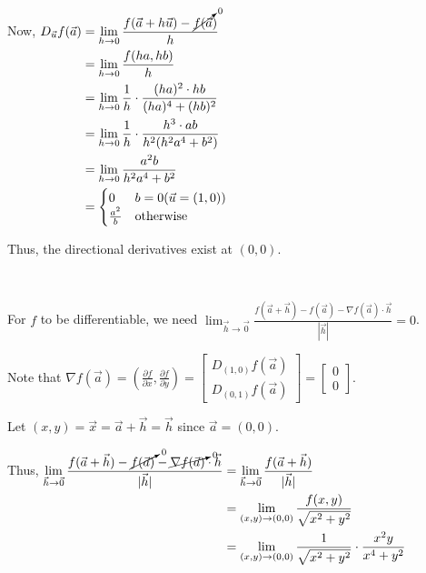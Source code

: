 \documentclass[11pt,fleqn]{book} %
\begin{document}
Now, 
$\begin{aligned}[t]
    D_{\vec{u}} f(\vec{a}) & = \lim_{h\to0} \frac{f(\vec{a} + h\vec{u}) - \cancelto{0}{f(\vec{a}})}{h} \\
                           & = \lim_{h\to0} \frac{f(ha, hb)}{h}                                        \\
                           & = \lim_{h\to0} \frac{1}{h} \cdot \frac{(ha)^2 \cdot hb}{(ha)^4 + (hb)^2}  \\
                           & = \lim_{h\to0} \frac{1}{h} \cdot \frac{h^3 \cdot ab}{h^2(h^2a^4 + b^2)}   \\
                           & = \lim_{h\to0} \frac{a^2b}{h^2a^4 + b^2}                                  \\
                           & = \begin{cases}
                                   0             & b = 0 (\vec{u} = (1,0)) \\
                                   \frac{a^2}{b} & \text{otherwise}
                               \end{cases}
\end{aligned}$

Thus, the directional derivatives exist at $(0,0)$. 

{~~~}

For $f$ to be differentiable, we need $\lim_{\vec{h}\to\vec{0}} \frac{f(\vec{a} + \vec{h}) - f(\vec{a}) - \nabla f(\vec{a}) \cdot \vec{h}}{| \vec{h} |} = 0$. 

Note that $\nabla f(\vec{a}) = \left( \frac{\partial f}{\partial x}, \frac{\partial f}{\partial y} \right) = \begin{bmatrix} D_{(1,0)} f(\vec{a}) \\ D_{(0,1)} f(\vec{a}) \end{bmatrix} = \begin{bmatrix} 0 \\ 0 \end{bmatrix}$.

Let $(x,y) = \vec{x} = \vec{a} + \vec{h} = \vec{h}$ since $\vec{a} = (0,0)$. 

Thus, 
$\begin{aligned}[t]
    \lim_{\vec{h}\to\vec{0}} \frac{f(\vec{a} + \vec{h}) - \cancelto{0}{f(\vec{a})} - \cancelto{0}{\nabla f(\vec{a})} \cdot \vec{h}}{| \vec{h} |}
     & = \lim_{\vec{h}\to\vec{0}} \frac{f(\vec{a} + \vec{h})}{| \vec{h} |}          \\
     & = \lim_{(x,y)\to(0,0)} \frac{f(x,y)}{\sqrt{x^2 + y^2}}                       \\
     & = \lim_{(x,y)\to(0,0)} \frac{1}{\sqrt{x^2+y^2}} \cdot \frac{x^2y}{x^4 + y^2} 
\end{aligned}$
\end{document}

